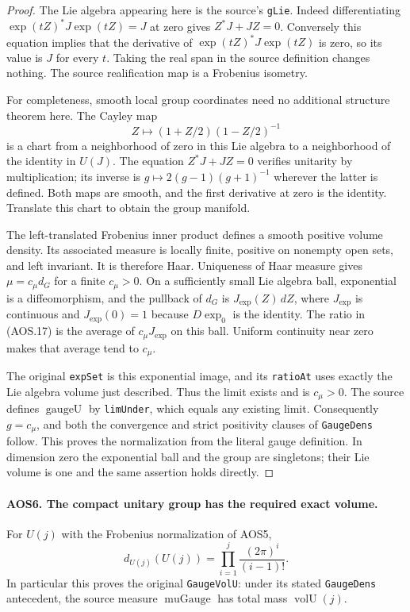 \begin{proof}
The Lie algebra appearing here is the source's \texttt{gLie}.
Indeed differentiating $\exp(tZ)^*J\exp(tZ)=J$ at zero gives
$Z^*J+JZ=0$.  Conversely this equation implies that the derivative
of $\exp(tZ)^*J\exp(tZ)$ is zero, so its value is $J$ for every
$t$.  Taking the real span in the source definition changes nothing.
The source realification map is a Frobenius isometry.

For completeness, smooth local group coordinates need no additional
structure theorem here.  The Cayley map
\[
       Z\longmapsto (1+Z/2)(1-Z/2)^{-1}
\]
is a chart from a neighborhood of zero in this Lie algebra to a
neighborhood of the identity in $U(J)$.  The equation
$Z^*J+JZ=0$ verifies unitarity by multiplication; its inverse is
$g\mapsto2(g-1)(g+1)^{-1}$ wherever the latter is defined.
Both maps are smooth, and the first derivative at zero is the
identity.  Translate this chart to obtain the group manifold.

The left-translated Frobenius inner product defines a smooth positive
volume density.  Its associated measure is locally finite, positive
on nonempty open sets, and left invariant.  It is therefore Haar.
Uniqueness of Haar measure gives $\mu=c_\mu d_G$ for a finite
$c_\mu>0$.  On a sufficiently small Lie algebra ball, exponential
is a diffeomorphism, and the pullback of $d_G$ is
$J_{\exp}(Z)\,dZ$, where $J_{\exp}$ is continuous and
$J_{\exp}(0)=1$ because $D\exp_0$ is the identity.  The ratio in
(AOS.17) is the average of $c_\mu J_{\exp}$ on this ball.  Uniform
continuity near zero makes that average tend to $c_\mu$.

The original \texttt{expSet} is this exponential image, and its
\texttt{ratioAt} uses exactly the Lie algebra volume just described.
Thus the limit exists and is $c_\mu>0$.  The source defines
$\operatorname{gaugeU}$ by \texttt{limUnder}, which equals any
existing limit.  Consequently $g=c_\mu$, and both the convergence
and strict positivity clauses of \texttt{GaugeDens} follow.  This
proves the normalization from the literal gauge definition.  In
dimension zero the exponential ball and the group are singletons;
their Lie volume is one and the same assertion holds directly.
\end{proof}

\paragraph{AOS6. The compact unitary group has the required exact volume.}
\label{claim:AOS6}
For $U(j)$ with the Frobenius normalization of AOS5,
\[
                  d_{U(j)}(U(j))
                      =\prod_{i=1}^{j}\frac{(2\pi)^i}{(i-1)!}.
 \tag{AOS.18}
\]
In particular this proves the original \texttt{GaugeVolU}: under its
stated \texttt{GaugeDens} antecedent, the source measure
$\operatorname{muGauge}$ has total mass $\operatorname{volU}(j)$.

